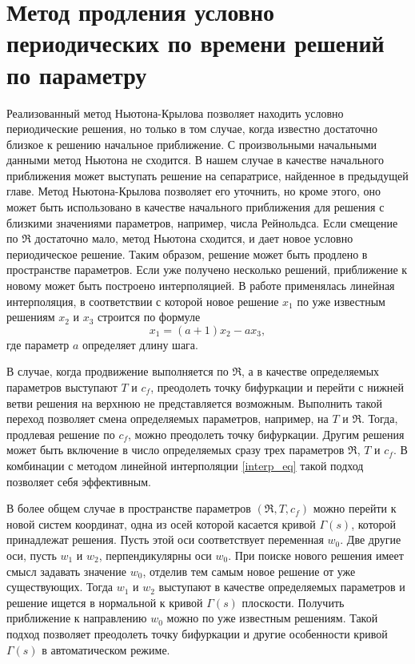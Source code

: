 \section{Метод продления условно периодических по времени решений по параметру}

Реализованный метод Ньютона-Крылова позволяет находить условно периодические решения, но только в том случае, когда известно достаточно близкое к решению начальное приближение. С произвольными начальными данными метод Ньютона не сходится. В нашем случае в качестве начального приближения может выступать решение на сепаратрисе, найденное в предыдущей главе. Метод Ньютона-Крылова позволяет его уточнить, но кроме этого, оно может быть использовано в качестве начального приближения для решения с близкими значениями параметров, например, числа Рейнольдса. Если смещение по $\Re$ достаточно мало, метод Ньютона сходится, и дает новое условно периодическое решение. Таким образом, решение может быть продлено в пространстве параметров. Если уже получено несколько решений, приближение к новому может быть построено интерполяцией. В работе применялась линейная интерполяция, в соответствии с которой новое решение $x_1$ по уже известным решениям $x_2$ и $x_3$ строится по формуле
\begin{equation} \label{interp_eq}
x_1 = (a + 1) x_2 - a x_3, 
\end{equation}
где параметр $a$ определяет длину шага. 

В случае, когда продвижение выполняется по $\Re$, а в качестве определяемых параметров выступают $T$ и $c_f$, преодолеть точку бифуркации и перейти с нижней ветви решения на верхнюю не представляется возможным. Выполнить такой переход позволяет смена определяемых параметров, например, на $T$ и $\Re$. Тогда, продлевая решение по $c_f$, можно преодолеть точку бифуркации. Другим решения может быть включение в число определяемых сразу трех параметров $\Re$, $T$ и $c_f$.  В комбинации с методом линейной интерполяции \eqref{interp_eq} такой подход позволяет себя эффективным.

В более общем случае в пространстве параметров $(\Re, T, c_f)$ можно перейти к новой систем координат, одна из осей которой касается кривой $\Gamma(s)$, которой принадлежат решения. Пусть этой оси соответствует переменная $w_0$. Две другие оси, пусть $w_1$ и $w_2$, перпендикулярны оси $w_0$. При поиске нового решения имеет смысл задавать значение $w_0$, отделив тем самым новое решение от уже существующих. Тогда $w_1$ и $w_2$ выступают в качестве определяемых параметров и решение ищется в нормальной к кривой $\Gamma(s)$ плоскости. Получить приближение к направлению $w_0$ можно по уже известным решениям. Такой подход позволяет преодолеть точку бифуркации и другие особенности кривой $\Gamma(s)$ в автоматическом режиме. 

